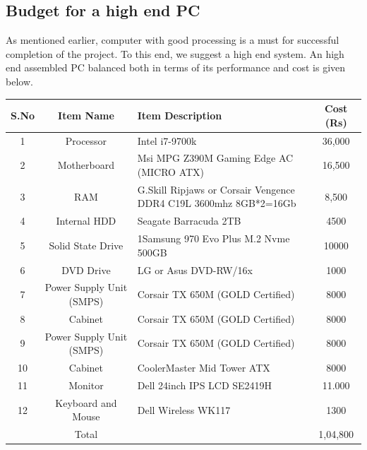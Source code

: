 \documentclass{FR16}
\begin{document}
\subsection{Budget for a high end PC }
As mentioned earlier, computer with good processing is a must for successful completion of the project. To this end, we suggest a high end system. An high end assembled PC balanced both in terms of its performance and cost is given below.
\begin{center}
\begin{tabular}[h]{||c ||c|| p{6 cm}|| c|| }
\arrayrulecolor{Azzurro}
\hline
\hline
{\bfseries S.No} & {\bfseries Item Name}& {\bfseries Item Description} & {\bfseries Cost (Rs)} \\
\hline
\hline
1 & Processor & Intel i7-9700k & 36,000\\
\hline
\hline
2 &Motherboard & Msi MPG Z390M Gaming Edge AC  (MICRO ATX) & 16,500  \\
\hline
\hline
3 &RAM & G.Skill Ripjaws or Corsair Vengence DDR4 C19L 3600mhz 8GB*2=16Gb & 8,500\\ 
\hline 
\hline
4 &Internal HDD & Seagate Barracuda 2TB & 4500\\ 
\hline
\hline
5 &Solid State Drive & 1Samsung 970 Evo Plus M.2 Nvme 500GB  & 10000\\
\hline
\hline
6 &DVD Drive & LG or Asus DVD-RW/16x & 1000\\
\hline
\hline
7 &Power Supply Unit (SMPS) &  Corsair TX 650M (GOLD Certified) & 8000\\
\hline
\hline
8 &Cabinet &  Corsair TX 650M (GOLD Certified) & 8000\\
\hline
\hline
9 &Power Supply Unit (SMPS) &  Corsair TX 650M (GOLD Certified)  & 8000\\
\hline
\hline
10 &Cabinet &  CoolerMaster Mid Tower ATX  & 8000\\
\hline
\hline
11 &Monitor &  Dell 24inch IPS LCD SE2419H  & 11.000\\
\hline
\hline
12 &Keyboard and Mouse &  Dell Wireless WK117  & 1300\\
\hline
\hline
 & Total & & 1,04,800
 
 \end{tabular}
\end{center}






\newpage
\end{document}

